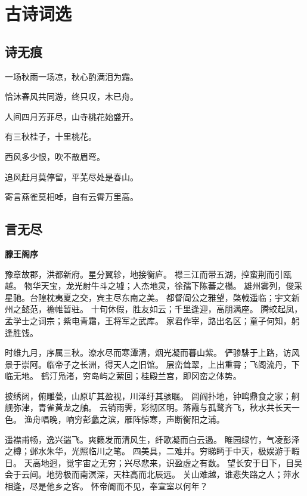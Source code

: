 \documentclass[UTF8,oneside]{ctexbook}
\begin{document}
\chapter{古诗词选}
\section{诗无痕}
\mfApache \quad 一场秋雨一场凉，秋心酌满泪为霜。

\mfApache \quad 恰沐春风共同游，终只叹，木已舟。

\mfApache \quad 人间四月芳菲尽，山寺桃花始盛开。

\mfApache \quad 有三秋桂子，十里桃花。

\mfApache \quad 西风多少恨，吹不散眉弯。

\mfApache \quad 追风赶月莫停留，平芜尽处是春山。

\mfApache \quad 寄言燕雀莫相啅，自有云霄万里高。

\mfApache \quad 

\section{言无尽}
\mfApache \quad \quad\quad\quad\quad \quad\quad\quad \quad\quad\textbf{滕王阁序}

豫章故郡，洪都新府。星分翼轸，地接衡庐。
襟三江而带五湖，控蛮荆而引瓯越。
物华天宝，龙光射牛斗之墟；人杰地灵，徐孺下陈蕃之榻。
雄州雾列，俊采星驰。台隍枕夷夏之交，宾主尽东南之美。
都督阎公之雅望，棨戟遥临；宇文新州之懿范，襜帷暂驻。
十旬休假，胜友如云；千里逢迎，高朋满座。
腾蛟起凤，孟学士之词宗；紫电青霜，王将军之武库。
家君作宰，路出名区；童子何知，躬逢胜饯。

时维九月，序属三秋。潦水尽而寒潭清，烟光凝而暮山紫。
俨骖騑于上路，访风景于崇阿。临帝子之长洲，得天人之旧馆。
层峦耸翠，上出重霄；飞阁流丹，下临无地。
鹤汀凫渚，穷岛屿之萦回；桂殿兰宫，即冈峦之体势。

披绣闼，俯雕甍，山原旷其盈视，川泽纡其骇瞩。
闾阎扑地，钟鸣鼎食之家；舸舰弥津，青雀黄龙之舳。
云销雨霁，彩彻区明。落霞与孤鹜齐飞，秋水共长天一色。
渔舟唱晚，响穷彭蠡之滨，雁阵惊寒，声断衡阳之浦。

遥襟甫畅，逸兴遄飞。爽籁发而清风生，纤歌凝而白云遏。
睢园绿竹，气凌彭泽之樽；邺水朱华，光照临川之笔。
四美具，二难并。穷睇眄于中天，极娱游于暇日。
天高地迥，觉宇宙之无穷；兴尽悲来，识盈虚之有数。
望长安于日下，目吴会于云间。地势极而南溟深，天柱高而北辰远。
关山难越，谁悲失路之人；萍水相逢，尽是他乡之客。
怀帝阍而不见，奉宣室以何年？
\end{document}
